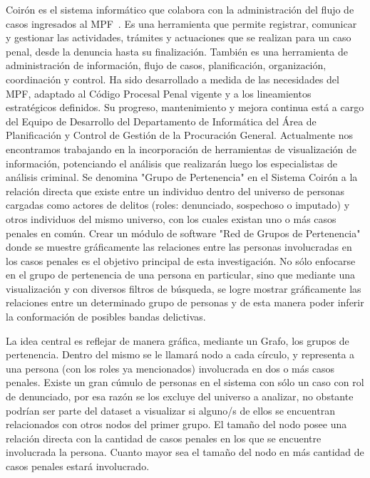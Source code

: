 Coirón es el sistema informático que colabora con la administración del flujo de casos ingresados al MPF~\cite{MPFChubutPaginaWeb}. Es una herramienta que permite registrar, comunicar y gestionar las actividades, trámites y actuaciones que se realizan para un caso penal, desde la denuncia hasta su finalización. También es una herramienta de administración de información, flujo de casos, planificación, organización, coordinación y control.
Ha sido desarrollado a medida de las necesidades del MPF, adaptado al Código Procesal Penal vigente y a los lineamientos estratégicos definidos. Su progreso, mantenimiento y mejora continua está a cargo del Equipo de Desarrollo del Departamento de Informática del Área de Planificación y Control de Gestión de la Procuración General.
Actualmente nos encontramos trabajando en la incorporación de herramientas de visualización de información, potenciando el análisis que realizarán luego los especialistas de análisis criminal.
Se denomina "Grupo de Pertenencia" en el Sistema Coirón a la relación directa que existe entre un individuo dentro del universo de personas cargadas como actores de delitos (roles: denunciado, sospechoso o imputado) y otros individuos del mismo universo, con los cuales existan uno o más casos penales en común.
Crear un módulo de software "Red de Grupos de Pertenencia" donde se muestre gráficamente las relaciones entre las personas involucradas en los casos penales es el objetivo principal de esta investigación. No sólo enfocarse en el grupo de pertenencia de una persona en particular, sino que mediante una visualización y con diversos filtros de búsqueda, se logre mostrar gráficamente las relaciones entre un determinado grupo de personas y de esta manera poder inferir la conformación de posibles bandas delictivas.

La idea central es reflejar de manera gráfica, mediante un Grafo, los grupos de pertenencia. Dentro del mismo se le llamará nodo a cada círculo, y representa a una persona (con los roles ya mencionados) involucrada en dos o más casos penales. Existe un gran cúmulo de personas en el sistema con sólo un caso con rol de denunciado, por esa razón se los excluye del universo a analizar, no obstante podrían ser parte del dataset a visualizar si alguno/s de ellos se encuentran relacionados con otros nodos del primer grupo. El tamaño del nodo posee una relación directa con la cantidad de casos penales en los que se encuentre involucrada la persona. Cuanto mayor sea el tamaño del nodo en más cantidad de casos penales estará involucrado.

